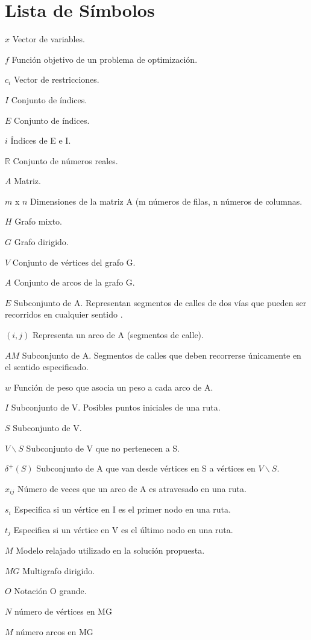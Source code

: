 \chapter*{Lista de Símbolos\hfill}

\begin{abbreviations}

    \item[$x$] Vector de variables.
    \item[$f$] Función objetivo de un problema de optimización.
    \item[$c_{i}$] Vector de restricciones.
    \item[$I$] Conjunto de índices.
    \item[$E$] Conjunto de índices.
    \item[$i$] Índices de E e I.
    \item[$\mathbb{R}$] Conjunto de números reales.
    \item[$A$] Matriz.
    \item[$m$ x $n$] Dimensiones de la matriz A (m números de filas, n números de columnas.
    
    \item[$H$] Grafo mixto.
    \item[$G$] Grafo dirigido.
    \item[$V$] Conjunto de vértices del grafo G.
    \item[$A$] Conjunto de arcos de la grafo G.
    \item[$E$] Subconjunto de A. Representan segmentos de calles de dos vías que pueden ser recorridos en cualquier sentido .
    \item[$(i,j)$] Representa un arco de A (segmentos de calle).
    \item[$AM$] Subconjunto de A. Segmentos de calles que deben recorrerse únicamente en el sentido especificado.
    \item[$w$] Función de peso que asocia un peso a cada arco de A.
    \item[$I$] Subconjunto de V. Posibles puntos iniciales de una ruta.
    \item[$S$] Subconjunto de V.
    \item[$V \backslash S$] Subconjunto de V que no pertenecen a S.
    \item[$\delta^+ (S)$] Subconjunto de A que van desde vértices en S a vértices en $V \backslash S$.
    \item[$x_{i j}$] Número de veces que un arco de A es atravesado en una ruta.
    \item[$s_i$] Especifica si un vértice en I es el primer nodo en una ruta.
    \item[$t_j$] Especifica si un vértice en V es el último nodo en una ruta.
    \item[$M$] Modelo relajado utilizado en la solución propuesta.
    \item[$MG$] Multigrafo dirigido.
    \item[$O$] Notación O grande.
    \item[$N$] número de vértices en MG
    \item[$M$] número arcos en MG
    

\end{abbreviations}
